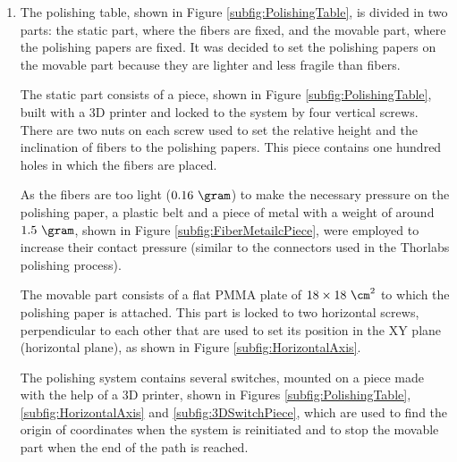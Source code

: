\begin{enumerate}
\item{} The polishing table, shown in Figure \ref{subfig:PolishingTable}, is divided in two parts: the static part, where the fibers are fixed, and the movable part, where the polishing papers are fixed. It was decided to set the polishing papers on the movable part because they are lighter and less fragile than fibers.

The static part consists of a piece, shown in Figure \ref{subfig:PolishingTable}, built with a 3D printer and locked to the system by four vertical screws. There are two nuts on each screw used to set the relative height and the inclination of fibers to the polishing papers. This piece contains one hundred holes in which the fibers are placed. 

As the fibers are too light ($0.16~\gram$) to make the necessary pressure on the polishing paper, a plastic belt and a piece of metal with a weight of around $1.5~\gram$, shown in Figure \ref{subfig:FiberMetailcPiece}, were employed to increase their contact pressure (similar to the connectors used in the Thorlabs polishing process). 

The movable part consists of a flat PMMA plate of $18 \times 18~\cm^2$ to which the polishing paper is attached. This part is locked to two horizontal screws, perpendicular to each other that are used to set its position in the XY plane (horizontal plane), as shown in Figure \ref{subfig:HorizontalAxis}.

The polishing system contains several switches,  mounted on a piece made with the help of a 3D printer, shown in Figures \ref{subfig:PolishingTable}, \ref{subfig:HorizontalAxis} and \ref{subfig:3DSwitchPiece}, which are used to find the origin of coordinates when the system is reinitiated and to stop the movable part when the end of the path is reached. 


\end{enumerate}
